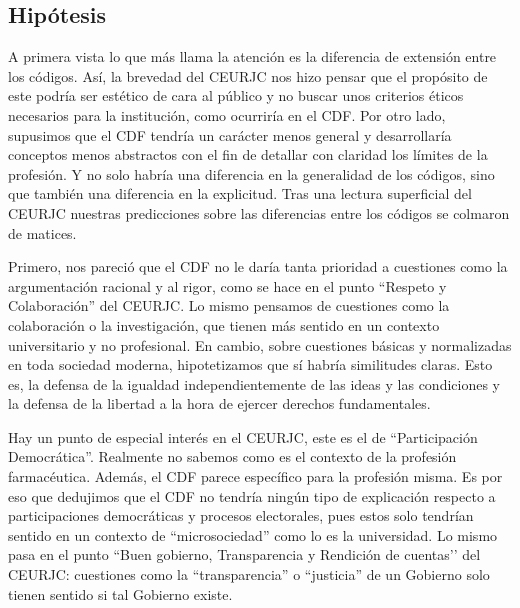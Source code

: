 \documentclass[11pt,a4paper]{article}
\begin{document}
\subsection{Hipótesis}

A primera vista lo que más llama la atención es la diferencia de extensión entre los códigos. Así, la brevedad del CEURJC nos hizo pensar que el propósito de este podría ser estético de cara al público y no buscar unos criterios éticos necesarios para la institución, como ocurriría en el CDF. Por otro lado, supusimos que el CDF tendría un carácter menos general y desarrollaría conceptos menos abstractos con el fin de detallar con claridad los límites de la profesión. Y no solo habría una diferencia en la generalidad de los códigos, sino que también una diferencia en la explicitud. Tras una lectura superficial del CEURJC nuestras predicciones sobre las diferencias entre los códigos se colmaron de matices.

Primero, nos pareció que el CDF no le daría tanta prioridad a cuestiones como la argumentación racional y al rigor, como se hace en el punto ``Respeto y Colaboración'' del CEURJC. Lo mismo pensamos de cuestiones como la colaboración o la investigación, que tienen más sentido en un contexto universitario y no profesional. En cambio, sobre cuestiones básicas y normalizadas en toda sociedad moderna, hipotetizamos que sí habría similitudes claras. Esto es, la defensa de la igualdad independientemente de las ideas y las condiciones y la defensa de la libertad a la hora de ejercer derechos fundamentales.

Hay un punto de especial interés en el CEURJC, este es el de ``Participación Democrática''. Realmente no sabemos como es el contexto de la profesión farmacéutica. Además, el CDF parece específico para la profesión misma. Es por eso que dedujimos que el CDF no tendría ningún tipo de explicación respecto a participaciones democráticas y procesos electorales, pues estos solo tendrían sentido en un contexto de ``microsociedad'' como lo es la universidad. Lo mismo pasa en el punto ``Buen gobierno, Transparencia y Rendición de cuentas'’ del CEURJC: cuestiones como la ``transparencia'' o ``justicia'' de un Gobierno solo tienen sentido si tal Gobierno existe.
\end{document}
